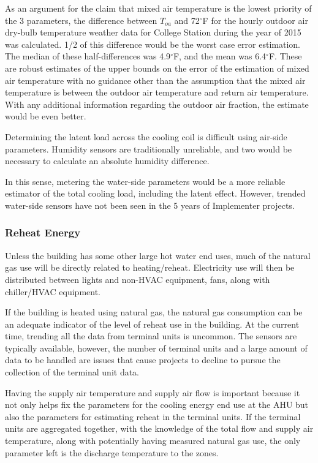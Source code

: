 As an argument for the claim that mixed air temperature is the lowest priority of
the 3 parameters, the difference between \(T_{oa}\) and 72\(^\circ\)F
for the hourly outdoor air dry-bulb temperature weather data for College
Station during the year of 2015 was calculated. 1/2 of this
difference would be the worst case error estimation. The median of these
half-differences was 4.9\(^\circ\)F, and the mean was 6.4\(^\circ\)F.
These are robust estimates of the upper bounds on the error of the
estimation of mixed air temperature with no guidance other than the assumption
that the mixed air temperature is between the outdoor air temperature and return
air temperature. With any additional information regarding the outdoor
air fraction, the estimate would be even better. 

Determining the latent load across the cooling coil is difficult using
air-side parameters. Humidity sensors are traditionally unreliable, and
two would be necessary to calculate an absolute humidity
difference.

In this sense, metering the water-side parameters would be a more
reliable estimator of the total cooling load, including the latent
effect. However, trended water-side sensors have not been seen in the 5
years of Implementer projects.

\subsubsection{Reheat Energy}

Unless the building has some other large hot water end uses, much of the
natural gas use will be directly related to heating/reheat. Electricity
use will then be distributed between lights and non-HVAC equipment,
fans, along with chiller/HVAC equipment. 

If the building is heated using natural gas, the natural gas consumption
can be an adequate indicator of the level of reheat use in the building.
At the current time, trending all the data from terminal units is
uncommon. The sensors are typically available, however, the number of
terminal units and a large amount of data to be handled are issues that
cause projects to decline to pursue the collection of the terminal unit data.

Having the supply air temperature and supply air flow is important
because it not only helps fix the parameters for the cooling energy end
use at the AHU but also the parameters for estimating reheat in the
terminal units. If the terminal units are aggregated together, with the
knowledge of the total flow and supply air temperature, along with
potentially having measured natural gas use, the only parameter left is
the discharge temperature to the zones. 

